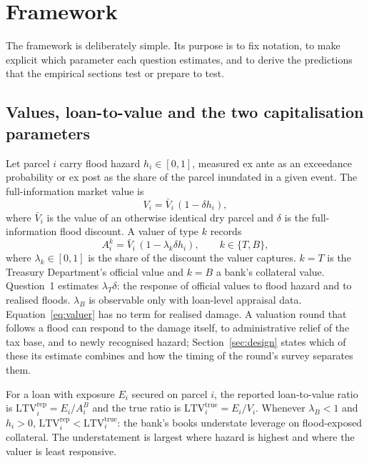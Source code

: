 \section{Framework}\label{sec:framework}

The framework is deliberately simple. Its purpose is to fix notation, to make explicit which parameter each question estimates, and to derive the predictions that the empirical sections test or prepare to test.

\subsection{Values, loan-to-value and the two capitalisation parameters}

Let parcel $i$ carry flood hazard $h_i \in [0,1]$, measured ex ante as an exceedance probability or ex post as the share of the parcel inundated in a given event. The full-information market value is
\begin{equation}
V_i = \bar V_i\,(1 - \delta h_i),
\end{equation}
where $\bar V_i$ is the value of an otherwise identical dry parcel and $\delta$ is the full-information flood discount. A valuer of type $k$ records
\begin{equation}
A_i^k = \bar V_i\,(1 - \lambda_k \delta h_i), \qquad k \in \{T, B\},
\label{eq:valuer}
\end{equation}
where $\lambda_k \in [0,1]$ is the share of the discount the valuer captures. $k = T$ is the Treasury Department's official value and $k = B$ a bank's collateral value. Question~1 estimates $\lambda_T \delta$: the response of official values to flood hazard and to realised floods. $\lambda_B$ is observable only with loan-level appraisal data. Equation~\eqref{eq:valuer} has no term for realised damage. A valuation round that follows a flood can respond to the damage itself, to administrative relief of the tax base, and to newly recognised hazard; Section~\ref{sec:design} states which of these its estimate combines and how the timing of the round's survey separates them.

For a loan with exposure $E_i$ secured on parcel $i$, the reported loan-to-value ratio is $\mathrm{LTV}^{\mathrm{rep}}_i = E_i / A_i^B$ and the true ratio is $\mathrm{LTV}^{\mathrm{true}}_i = E_i / V_i$. Whenever $\lambda_B < 1$ and $h_i > 0$, $\mathrm{LTV}^{\mathrm{rep}}_i < \mathrm{LTV}^{\mathrm{true}}_i$: the bank's books understate leverage on flood-exposed collateral. The understatement is largest where hazard is highest and where the valuer is least responsive.

